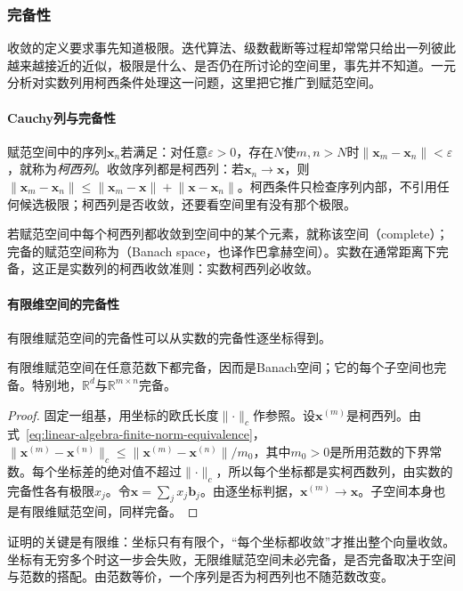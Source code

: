 \subsubsection{完备性}
\label{sec:ls-banach-spaces}

收敛的定义要求事先知道极限。迭代算法、级数截断等过程却常常只给出一列彼此越来越接近的近似，极限是什么、是否仍在所讨论的空间里，事先并不知道。一元分析对实数列用柯西条件处理这一问题，这里把它推广到赋范空间。

\paragraph{Cauchy列与完备性}
赋范空间中的序列$\bm x_n$若满足：对任意$\varepsilon>0$，存在$N$使$m,n>N$时$\lVert\bm x_m-\bm x_n\rVert<\varepsilon$，就称为\emph{柯西列}。收敛序列都是柯西列：若$\bm x_n\to\bm x$，则$\lVert\bm x_m-\bm x_n\rVert\leq\lVert\bm x_m-\bm x\rVert+\lVert\bm x-\bm x_n\rVert$。柯西条件只检查序列内部，不引用任何候选极限；柯西列是否收敛，还要看空间里有没有那个极限。

若赋范空间中每个柯西列都收敛到空间中的某个元素，就称该空间（complete）；完备的赋范空间称为（Banach space，也译作巴拿赫空间）。实数在通常距离下完备，这正是实数列的柯西收敛准则：实数柯西列必收敛。

\paragraph{有限维空间的完备性}
有限维赋范空间的完备性可以从实数的完备性逐坐标得到。
\begin{theorem}[有限维赋范空间的完备性]
\label{thm:ls-finite-dimensional-complete}
有限维赋范空间在任意范数下都完备，因而是Banach空间；它的每个子空间也完备。特别地，$\mathbb R^d$与$\mathbb R^{m\times n}$完备。
\end{theorem}
\begin{proof}
固定一组基，用坐标的欧氏长度$\lVert\cdot\rVert_c$作参照。设$\bm x^{(m)}$是柯西列。由式~\eqref{eq:linear-algebra-finite-norm-equivalence}，$\lVert\bm x^{(m)}-\bm x^{(n)}\rVert_c\leq\lVert\bm x^{(m)}-\bm x^{(n)}\rVert/m_0$，其中$m_0>0$是所用范数的下界常数。每个坐标差的绝对值不超过$\lVert\cdot\rVert_c$，所以每个坐标都是实柯西数列，由实数的完备性各有极限$x_j$。令$\bm x=\sum_jx_j\bm b_j$。由逐坐标判据，$\bm x^{(m)}\to\bm x$。子空间本身也是有限维赋范空间，同样完备。
\end{proof}
证明的关键是有限维：坐标只有有限个，“每个坐标都收敛”才推出整个向量收敛。坐标有无穷多个时这一步会失败，无限维赋范空间未必完备，是否完备取决于空间与范数的搭配。由范数等价，一个序列是否为柯西列也不随范数改变。

